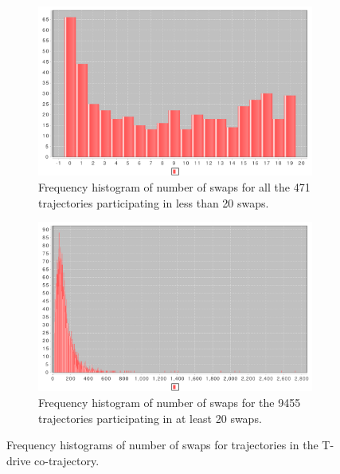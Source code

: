 \documentclass[12pt]{article}
\theoremstyle{definition}
\begin{document}
\begin{figure}
  \centering
  \begin{subfigure}[t]{0.49\textwidth}
    \includegraphics[width=\textwidth]{figures/swaps-distribution-20.pdf}
    \caption{Frequency histogram of number of swaps for all the 471
      trajectories participating in less than 20 swaps.}
    \label{fig:swaps-distribution-20}
  \end{subfigure}
  \begin{subfigure}[t]{0.49\textwidth}
    \includegraphics[width=\textwidth]{figures/swaps-distribution-other.pdf}
    \caption{Frequency histogram of number of swaps for the 9455
      trajectories participating in at least 20 swaps.}
    \label{fig:swaps-distribution-other}
  \end{subfigure}
  \caption{Frequency histograms of number of swaps for trajectories in
    the T-drive co-trajectory.}
  \label{fig:swaps-distribution}
\end{figure}
\end{document}
